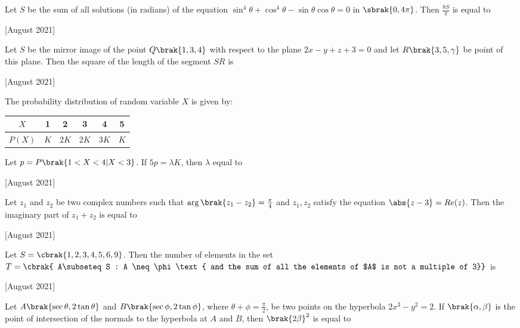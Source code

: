 \iffalse
  \title{2021}
  \author{EE24BTECH11010}
  \section{integer}
\fi
\item Let $S$ be the sum of all solutions (in radians) of the equation $\sin^4\theta + \cos ^4 \theta - \sin \theta \cos \theta = 0$ in $\sbrak{0, 4\pi}$. Then $\frac{8S}{\pi}$ is equal to 
    
    \hfill [August 2021]
    
    \item Let $S$ be the mirror image of the point $Q\brak{1,3,4}$ with respect to the plane $2x - y + z + 3 = 0$ and let $R\brak{3,5,\gamma} $ be point of this plane. Then the square of the length of the segment $SR$ is 
    
    \hfill [August 2021] 
    
    \item The probability distribution of random variable $X$ is given by: \\
    \begin{table}[h!]
    \centering
    \begin{tabular}[12pt]{ |c| c| c|c|c|c|}
    \hline
    $X$ & 1 & 2 & 3 & 4 & 5 \\
    \hline
    $P(X)$ & $K$ & 2$K$ & 2$K$ & 3$K$ & $K$ \\
    \hline 
    \end{tabular} 

    \end{table} 
    
    Let $p = P \brak{1 < X < 4 | X < 3}$. If $5p = \lambda K$, then $\lambda$ equal to 
    
    \hfill[August 2021] 
    
    \item Let $z_1$ and $z_2$ be two complex numbers such that $\arg{\brak{z_1 - z_2}} = \frac{\pi}{4}$ 
 and $z_1, z_2$ satisfy the equation $\abs{ z -
 3 }= Re(z)$. Then the imaginary part of $z_1 + z_2$ is equal to 
 
 \hfill[August 2021]
 
 \item Let $S=\cbrak{1, 2, 3, 4, 5, 6, 9}$. Then the number of elements in the set $T = \cbrak{ A\subseteq 
 S : A \neq \phi  \text{ and the sum of all the elements of $A$ is not a multiple of 3}}$ is 
     
     \hfill[August 2021]
     
    \item Let $A\brak{\sec \theta, 2\tan \theta}$ and $B \brak{\sec \phi, 2 \tan \phi}$, where $\theta + \phi = \frac{\pi}{2}$, be two points on the hyperbola $2x^3 - y^2 = 2$. If $\brak{\alpha, \beta}$ is the point of intersection of the normals to the hyperbola at $A$ and $B$, then $\brak{2\beta}^2$ is equal to 
    
